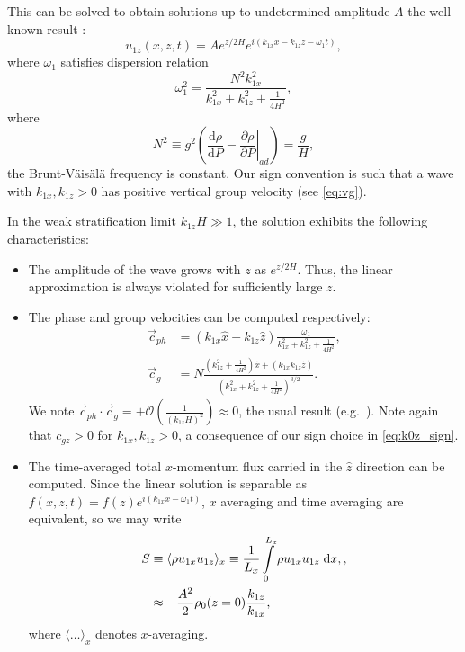 \documentclass[
        fleqn,
        usenatbib,
    ]{mnras}
\newcommand*{\rd}[2]{\frac{\mathrm{d}#1}{\mathrm{d}#2}}
\newcommand*{\pd}[2]{\frac{\partial#1}{\partial#2}}
\newcommand*{\at}[1]{\left.#1\right|}
\newcommand*{\ev}[1]{\langle#1\rangle}
\newcommand*{\p}[1]{\left(#1\right)}
\begin{document}
This can be solved to obtain solutions up to undetermined amplitude $A$ the
well-known result \citep{drazin,sutherland0}:
\begin{equation}
    u_{1z}\p{x, z, t} = Ae^{z/2H}e^{i\p{k_{1x}x - k_{1z}z - \omega_1 t}},
        \label{eq:k0z_sign}
\end{equation}
where $\omega_1$ satisfies dispersion relation
\begin{equation}
    \omega_1^2 = \frac{N^2k_{1x}^2}{k_{1x}^2 + k_{1z}^2 + \frac{1}{4H^2}},
        \label{eq:disp_rel}
\end{equation}
where
\begin{equation}
    N^2 \equiv g^2\p{\rd{\rho}{P} - \at{\pd{\rho}{P}}_{ad}} = \frac{g}{H},
\end{equation}
the Brunt-V\"ais\"al\"a frequency is constant. Our sign convention is such that
a wave with $k_{1x}, k_{1z} > 0$ has positive vertical group velocity (see
\autoref{eq:vg}).

In the weak stratification limit $k_{1z}H \gg 1$, the solution exhibits the
following characteristics:
\begin{itemize}
    \item The amplitude of the wave grows with $z$ as $e^{z/2H}$. Thus, the
        linear approximation is always violated for sufficiently large $z$.

    \item The phase and group velocities can be computed respectively:
        \begin{align}
            \vec{c}_{ph} &=
                \p{k_{1x}\hat{x} - k_{1z}\hat{z}}\frac{\omega_1}
                {k_{1x}^2 + k_{1z}^2 + \frac{1}{4H^2}},\\
            \vec{c}_{g} &= N\frac{\p{k_{1z}^2 + \frac{1}{4H^2}}\hat{x}
                + \p{k_{1x}k_{1z}\hat{z}}}
                {\p{k_{1x}^2 + k_{1z}^2 + \frac{1}{4H^2}}^{3/2}}.\label{eq:vg}
        \end{align}
        We note $\vec{c}_{ph} \cdot \vec{c}_g = +
        \mathcal{O}\p{\frac{1}{\p{k_{1z}H}^{2}}} \approx 0$, the usual result
        (e.g.\  \citep{drazin,sutherland1}). Note again that $c_{gz} > 0$ for
        $k_{1x}, k_{1z} > 0$, a consequence of our sign choice in
        \autoref{eq:k0z_sign}.

    \item The time-averaged total $x$-momentum flux carried in the $\hat{z}$
        direction can be computed. Since the linear solution is separable as
        $f(x, z, t) = f(z)e^{i(k_{1x}x - \omega_1 t)}$, $x$ averaging and time
        averaging are equivalent, so we may write
        \begin{align}
            S &\equiv \ev{\rho u_{1x} u_{1z}}_x \equiv
                \frac{1}{L_x}\int_0^{L_x}\limits \rho u_{1x} u_{1z}\;\mathrm{d}x,
                    \label{eq:S_def},\\
                &\approx -\frac{A^2}{2}\rho_0(z=0)\frac{k_{1z}}{k_{1x}},
                    \label{eq:S_lin}
        \end{align}
        where $\ev{\dots}_x$ denotes $x$-averaging.
\end{itemize}
\end{document}
